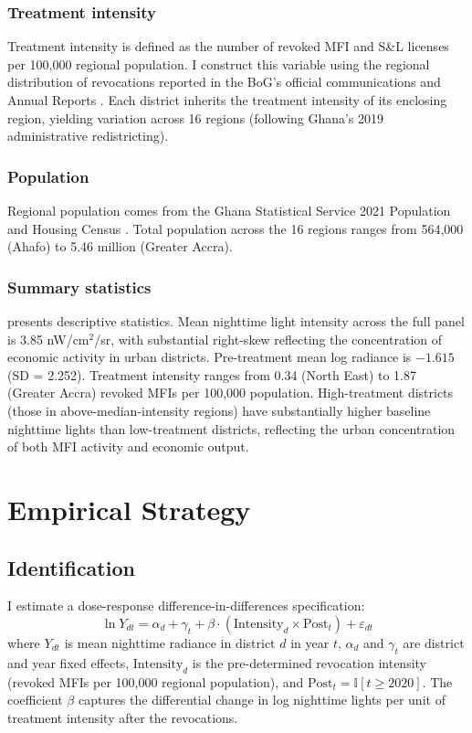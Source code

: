\documentclass[12pt]{article}
\newcommand{\ind}{\mathbb{I}}
\begin{document}
\subsubsection*{Treatment intensity} Treatment intensity is defined as the number of revoked MFI and S\&L licenses per 100,000 regional population. I construct this variable using the regional distribution of revocations reported in the BoG's official communications and Annual Reports \citep{BoG2018AR, BoG2019}. Each district inherits the treatment intensity of its enclosing region, yielding variation across 16 regions (following Ghana's 2019 administrative redistricting).

\subsubsection*{Population} Regional population comes from the Ghana Statistical Service 2021 Population and Housing Census \citep{GSS2021}. Total population across the 16 regions ranges from 564,000 (Ahafo) to 5.46 million (Greater Accra).

\subsubsection*{Summary statistics}  presents descriptive statistics. Mean nighttime light intensity across the full panel is 3.85 nW/cm$^2$/sr, with substantial right-skew reflecting the concentration of economic activity in urban districts. Pre-treatment mean log radiance is $-1.615$ (SD = 2.252). Treatment intensity ranges from 0.34 (North East) to 1.87 (Greater Accra) revoked MFIs per 100,000 population. High-treatment districts (those in above-median-intensity regions) have substantially higher baseline nighttime lights than low-treatment districts, reflecting the urban concentration of both MFI activity and economic output.



\section{Empirical Strategy}

\subsection{Identification}

I estimate a dose-response difference-in-differences specification:
\begin{equation}
\ln Y_{dt} = \alpha_d + \gamma_t + \beta \cdot (\text{Intensity}_d \times \text{Post}_t) + \varepsilon_{dt}
\label{eq:main}
\end{equation}
where $Y_{dt}$ is mean nighttime radiance in district $d$ in year $t$, $\alpha_d$ and $\gamma_t$ are district and year fixed effects, $\text{Intensity}_d$ is the pre-determined revocation intensity (revoked MFIs per 100,000 regional population), and $\text{Post}_t = \ind[t \geq 2020]$. The coefficient $\beta$ captures the differential change in log nighttime lights per unit of treatment intensity after the revocations.
\end{document}
